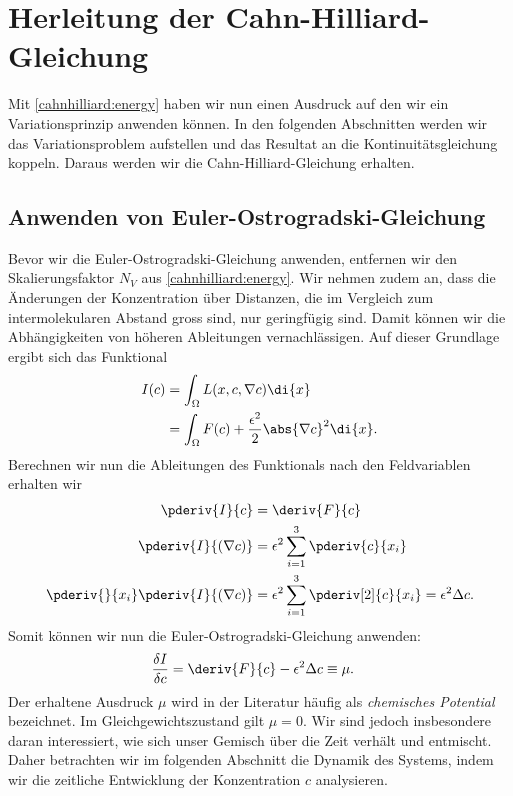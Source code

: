 %
%
%
%
\section{Herleitung der Cahn-Hilliard-Gleichung\label{cahnhilliard:section:herleitung}}
Mit \eqref{cahnhilliard:energy} haben wir nun einen Ausdruck auf den wir ein Variationsprinzip anwenden können.
In den folgenden Abschnitten werden wir das Variationsproblem aufstellen und
das Resultat an die Kontinuitätsgleichung koppeln.
Daraus werden wir die Cahn-Hilliard-Gleichung erhalten.

\subsection{Anwenden von Euler-Ostrogradski-Gleichung}
Bevor wir die Euler-Ostrogradski-Gleichung anwenden,
entfernen wir den Skalierungsfaktor $N_V$ aus \eqref{cahnhilliard:energy}.
Wir nehmen zudem an,
dass die Änderungen der Konzentration über Distanzen,
die im Vergleich zum intermolekularen Abstand gross sind,
nur geringfügig sind.
Damit können wir die Abhängigkeiten von höheren Ableitungen vernachlässigen.
Auf dieser Grundlage ergibt sich das Funktional
\begin{align}
I(c)
&=
\int_\Omega L(x, c, \nabla c) \di{x}
\nonumber
\\
&=
\int_\Omega F(c) + \frac{\epsilon^2}{2} \abs{\nabla c}^2 \di{x}.
\end{align}
Berechnen wir nun die Ableitungen des Funktionals nach den Feldvariablen erhalten wir
\begin{align*}
\pderiv{I}{c}
&=
\deriv{F}{c}
\\
\pderiv{I}{(\nabla c)}
&=
\epsilon^2 \sum_{i=1}^3 \pderiv{c}{x_i}
\\
\pderiv{}{x_i}\pderiv{I}{(\nabla c)}
&=
\epsilon^2 \sum_{i=1}^3 \pderiv[2]{c}{x_i}
=
\epsilon^2 \Delta c
.
\end{align*}
Somit können wir nun die Euler-Ostrogradski-Gleichung anwenden:
\begin{align*}
\frac{\delta I}{\delta c}
&=
\deriv{F}{c} -  \epsilon^2 \Delta c
\equiv
\mu
.
\end{align*}
Der erhaltene Ausdruck $\mu$ wird in der Literatur häufig als
\emph{chemisches Potential} bezeichnet.
Im Gleichgewichtszustand gilt $\mu = 0$.
Wir sind jedoch insbesondere daran interessiert,
wie sich unser Gemisch über die Zeit verhält und entmischt.
Daher betrachten wir im folgenden Abschnitt die Dynamik des Systems,
indem wir die zeitliche Entwicklung der Konzentration
$c$ analysieren.

